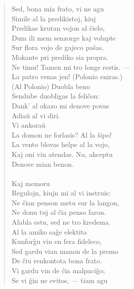 \begin{verse}
                Sed, bona mia frato, vi ne agu\\
                Simile al la predikistoj, kiuj\\
                Predikas krutan vojon al \^cielo,\\
                Dum ili mem senzorge kaj volupte\\
                Sur flora vojo de gajeco pa\^sas,\\
                Mokante pri prediko sia propra.\\
 Ne timu! Tamen mi tro longe restis. ---\\
                La patro venas jen! {\footnotesize (Polonio eniras.)}\\
                 {\footnotesize (Al Polonio)} Duobla beno\\
                Sendube duobligas la feli\^con:\\
                Dank' al okazo mi denove povas\\
                Adia\u u al vi diri.\\
 Vi ankora\u u\\
                La domon ne forlasis? Al la \^sipo!\\
                La vento blovas helpe al la vojo,\\
                Kaj oni vin atendas. Nu, akceptu\\
                Denove mian benon.\\
                \\
                Kaj memoru\\
                Regulojn, kiujn mi al vi instruis:\\
                Ne \^cian penson metu sur la langon,\\
                Ne donu tuj al \^cia penso faron.\\
                Afabla estu, sed ne tro kredema.\\
                Al la amiko sa\^ge elektita\\
                Kunfor\^gu vin en fera fideleco,\\
                Sed gardu vian manon de la premo\\
                De \^ciu renkontota bona frato.\\
                Vi gardu vin de \^cia malpaci\^go;\\
                Se vi \^gin ne evitos, --- tiam agu\\

\end{verse}
